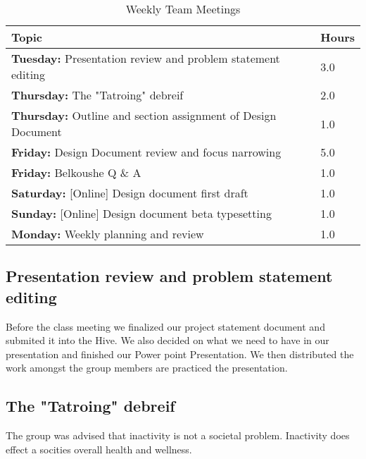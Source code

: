 \documentclass[12pt,article,compsoc]{IEEEtran}
\begin{document}
	
	\begin{table}[ht]
		\renewcommand{\arraystretch}{1.3}
			\caption{Weekly Team Meetings}
			
			\label{Team Hour Summary}
			
			\centering
			\begin{tabular}{p{7cm}|p{1cm}}
			\hline
			{\bfseries 	Topic} 																		&{\bfseries Hours}		\\
			\hline\hline
						{\bfseries Tuesday:} Presentation review and problem statement editing		& 3.0					\\
						{\bfseries Thursday:} The "Tatroing" debreif								& 2.0					\\
						{\bfseries Thursday:} Outline and section assignment of Design Document		& 1.0 					\\	
						{\bfseries Friday:}	Design Document review and focus narrowing				& 5.0					\\
						{\bfseries Friday:}	Belkoushe Q \& A										& 1.0 					\\
						{\bfseries Saturday:} [Online] Design document first draft					& 1.0 					\\
						{\bfseries Sunday:}	[Online] Design document beta typesetting				& 1.0 					\\
						{\bfseries Monday:} Weekly planning and review 								& 1.0 					\\	
			\hline
			\end{tabular}
		\end{table}
		 
	\subsection{Presentation review and problem statement editing}
				Before the class meeting we finalized our project statement document and submited it into 
    			the Hive. We also decided on what we need to have in our presentation and finished our Power
                point Presentation. We then distributed the work amongst the group members are practiced
                the presentation.
                
	\subsection{The "Tatroing" debreif}
		        The group was advised that inactivity is not a societal problem. Inactivity does effect a
                socities overall health and wellness.
                
\end{document}
